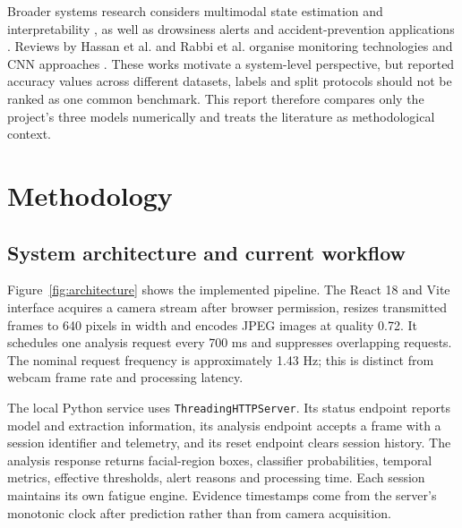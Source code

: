 \documentclass[pdflatex,sn-mathphys-num]{sn-jnl}
\begin{document}
Broader systems research considers multimodal state estimation and interpretability \cite{sah2026multimodal}, as well as drowsiness alerts and accident-prevention applications \cite{mahapatra2026alerts}. Reviews by Hassan et al. and Rabbi et al. organise monitoring technologies and CNN approaches \cite{hassan2026survey,rabbi2026review}. These works motivate a system-level perspective, but reported accuracy values across different datasets, labels and split protocols should not be ranked as one common benchmark. This report therefore compares only the project's three models numerically and treats the literature as methodological context.

\section{Methodology}\label{sec:method}
\subsection{System architecture and current workflow}
Figure~\ref{fig:architecture} shows the implemented pipeline. The React 18 and Vite interface acquires a camera stream after browser permission, resizes transmitted frames to 640 pixels in width and encodes JPEG images at quality 0.72. It schedules one analysis request every 700 ms and suppresses overlapping requests. The nominal request frequency is approximately 1.43 Hz; this is distinct from webcam frame rate and processing latency.

The local Python service uses \texttt{ThreadingHTTPServer}. Its status endpoint reports model and extraction information, its analysis endpoint accepts a frame with a session identifier and telemetry, and its reset endpoint clears session history. The analysis response returns facial-region boxes, classifier probabilities, temporal metrics, effective thresholds, alert reasons and processing time. Each session maintains its own fatigue engine. Evidence timestamps come from the server's monotonic clock after prediction rather than from camera acquisition.
\end{document}
